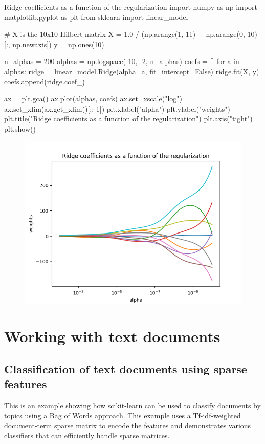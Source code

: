 \begin{py}{Ridge coefficients as a function of the regularization}
import numpy as np
import matplotlib.pyplot as plt
from sklearn import linear_model

# X is the 10x10 Hilbert matrix
X = 1.0 / (np.arange(1, 11) + np.arange(0, 10)[:, np.newaxis])
y = np.ones(10)

n_alphas = 200
alphas = np.logspace(-10, -2, n_alphas)
coefs = []
for a in alphas:
    ridge = linear_model.Ridge(alpha=a, fit_intercept=False)
    ridge.fit(X, y)
    coefs.append(ridge.coef_)

ax = plt.gca()
ax.plot(alphas, coefs)
ax.set_xscale("log")
ax.set_xlim(ax.get_xlim()[::-1])
plt.xlabel("alpha")
plt.ylabel("weights")
plt.title("Ridge coefficients as a function of the regularization")
plt.axis("tight")
plt.show()
\end{py}
\begin{figure}
\centering
\includegraphics{img/Ridge coefficients as a function of the regularization.png}
\end{figure}

\chapter{Working with text documents\label{Working with text documents}}
\section{Classification of text documents using sparse features\label{Classification of text documents using sparse features}}
This is an example showing how scikit-learn can be used to classify documents by topics using a \href{https://en.wikipedia.org/wiki/Bag-of-words_model}{Bag of Words} approach. This example uses a Tf-idf-weighted document-term sparse matrix to encode the features and demonstrates various classifiers that can efficiently handle sparse matrices.

